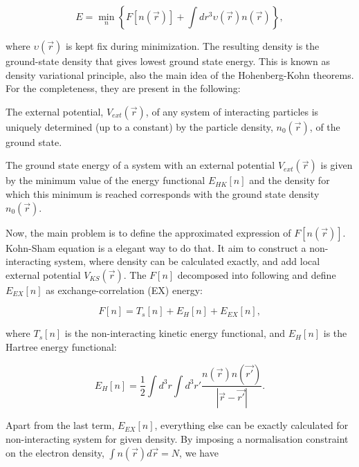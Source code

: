 \begin{equation}
E=\min_n \left\lbrace F[n(\vec{r})] + \int dr^3\upsilon(\vec{r})n(\vec{r}) \right\rbrace,
\end{equation}

where $\upsilon(\vec{r})$ is kept fix during minimization. The resulting density is the ground-state density that gives lowest ground state energy. This is known as density variational principle, also the main idea of the Hohenberg-Kohn theorems. For the completeness, they are present in the following:

\begin{theorem}

The external potential, $V_{ext}(\vec{r})$, of any system of interacting particles is uniquely determined (up to a constant) by the particle density, $n_0(\vec{r})$, of the ground state.

\end{theorem}

\begin{theorem}

The ground state energy of a system with an external potential $V_{ext}(\vec{r})$ is given by the minimum value of the energy functional $E_{HK} [n]$ and the density for which this minimum is reached corresponds with the ground state density $n_0(\vec{r})$.

\end{theorem}

Now, the main problem is to define the approximated expression of $F[n(\vec{r})]$. Kohn-Sham equation is a elegant way to do that. It aim to construct a non-interacting system, where density can be calculated exactly, and add local external potential $V_{KS}(\vec{r})$. The $F[n]$ decomposed into following and define $E_{EX}[n]$ as exchange-correlation (EX) energy:

\begin{equation}
F[n]=T_s[n]+E_H[n]+E_{EX}[n],
\end{equation}

where $T_s[n]$ is the non-interacting kinetic energy functional, and $E_H[n]$ is the Hartree energy functional:

\begin{equation}
E_H[n]=\frac{1}{2}\int d^3r\int d^3r\prime\frac{n(\vec{r})n(\vec{r\prime})}{|\vec{r}-\vec{r\prime}|}.
\end{equation}

Apart from the last term, $E_{EX}[n]$, everything else can be exactly calculated for non-interacting system for given density. By imposing a normalisation constraint on the electron density, $\int n(\vec{r})d\vec{r}=N$, we have

